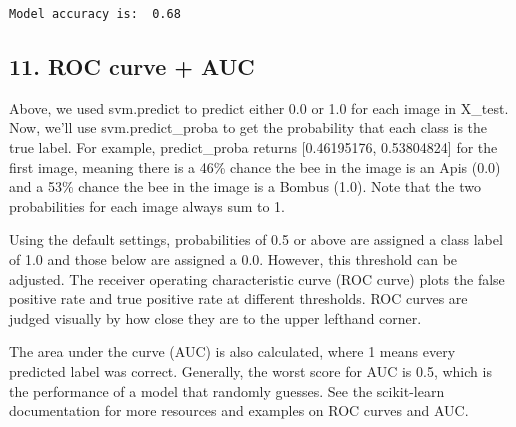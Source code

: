 \documentclass[11pt]{article}
\begin{document}
    \begin{Verbatim}[commandchars=\\\{\}]
Model accuracy is:  0.68

    \end{Verbatim}

    \subsection{11. ROC curve + AUC}\label{roc-curve-auc}

Above, we used svm.predict to predict either 0.0 or 1.0 for each image
in X\_test. Now, we'll use svm.predict\_proba to get the probability
that each class is the true label. For example, predict\_proba returns
{[}0.46195176, 0.53804824{]} for the first image, meaning there is a
46\% chance the bee in the image is an Apis (0.0) and a 53\% chance the
bee in the image is a Bombus (1.0). Note that the two probabilities for
each image always sum to 1.

Using the default settings, probabilities of 0.5 or above are assigned a
class label of 1.0 and those below are assigned a 0.0. However, this
threshold can be adjusted. The receiver operating characteristic curve
(ROC curve) plots the false positive rate and true positive rate at
different thresholds. ROC curves are judged visually by how close they
are to the upper lefthand corner.

The area under the curve (AUC) is also calculated, where 1 means every
predicted label was correct. Generally, the worst score for AUC is 0.5,
which is the performance of a model that randomly guesses. See the
scikit-learn documentation for more resources and examples on ROC curves
and AUC.
\end{document}
